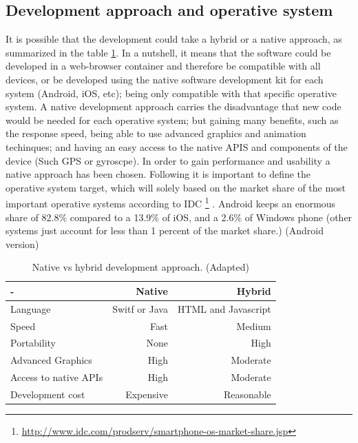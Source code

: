 \subsection{Development approach and operative system}
It is possible that the development could take a hybrid or a native approach, as summarized in the table \ref{tab:development_approaches}. In a nutshell, it means that the software could be developed in a web-browser container and therefore be compatible with all devices, or be developed using the native software development kit for each system (Android, iOS, etc); being only compatible with that specific operative system. A native development approach carries the disadvantage that new code would be needed for each operative system; but gaining many benefits, such as the response speed, being able to use advanced graphics and animation techinques; and having an easy access to the native APIS and components of the device (Such GPS or gyroscpe). In order to gain performance and usability a native approach has been chosen. Following it is important to define the operative system target, which will solely based on the market share of the most important operative systems according to IDC \footnote{\url{http://www.idc.com/prodserv/smartphone-os-market-share.jsp}} . Android keeps an enormous share of 82.8\% compared to a 13.9\% of iOS, and a 2.6\% of Windows phone (other systems just account for less than 1 percent of the market share.) 
(Android version)

\begin{table}[ht]
\centering
\begin{adjustbox}{width=.6\textwidth,center=\textwidth}
\begin{tabular}{lrr}
  \hline
   - & Native & Hybrid  \\ \hline
   Language & Switf or Java & HTML and Javascript \\
   Speed & Fast & Medium \\
   Portability & None & High \\
   Advanced Graphics & High & Moderate \\
   Access to native APIs & High & Moderate \\
   Development cost & Expensive & Reasonable \\
   \hline
\end{tabular}
\end{adjustbox}
  \caption[Native vs hybrid development approach ]{Native vs hybrid development approach. (Adapted) \footnotemark }
\label{tab:development_approaches}
\end{table} 

